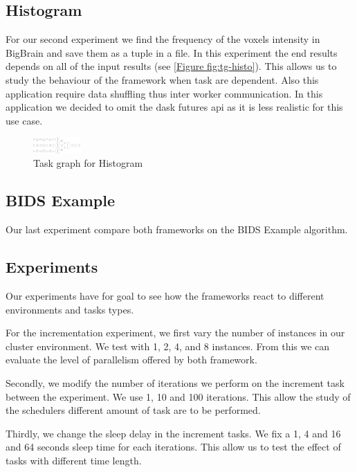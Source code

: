 \documentclass[11pt,a4paper]{article}
\begin{document}
\subsection{Histogram}
For our second experiment we find the frequency of the voxels intensity in BigBrain
and save them as a tuple in a file. In this experiment the end results depends on all
of the input results (see \ref{Figure fig:tg-histo}). This allows us to study the behaviour
of the framework when task are dependent. Also this application require data
shuffling thus inter worker communication. In this application we decided to omit the
dask futures api as it is less realistic for this use case.

\begin{figure}[ht]
    \centering
    \includegraphics[width=0.16\textwidth, angle=-90]{images/histogram-task-graph.png}
    \caption{Task graph for Histogram}
    \label{fig:tg-histo}
\end{figure}

\subsection{BIDS Example}
Our last experiment compare both frameworks on the BIDS Example algorithm.


\subsection{Experiments}
Our experiments have for goal to see how the frameworks react to different
environments and tasks types.

For the incrementation experiment, we
first vary the number of instances in our cluster environment. We test with 1, 2, 4,
and 8 instances. From this we can evaluate the level of parallelism offered by
both framework.

Secondly, we modify the number of iterations we perform on the increment task between
the experiment. We use 1, 10 and 100 iterations. This allow the study of the
schedulers different amount of task are to be performed.

Thirdly, we change the sleep delay in the increment tasks. We fix a 1, 4 and 16 and
64 seconds sleep time for each iterations. This allow us to test the effect of tasks
with different time length.
\end{document}
